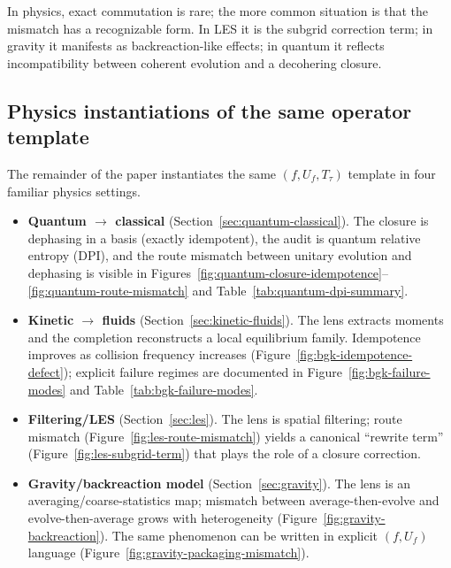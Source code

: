 \documentclass[11pt]{article}
\providecommand{\Lens}{f}
\providecommand{\Uf}{U_f}
\begin{document}
In physics, exact commutation is rare; the more common situation is that the mismatch has a recognizable form. In LES it is the subgrid correction term; in gravity it manifests as backreaction-like effects; in quantum it reflects incompatibility between coherent evolution and a decohering closure.

\subsection{Physics instantiations of the same operator template}
The remainder of the paper instantiates the same $(\Lens,\Uf,T_\tau)$ template in four familiar physics settings.
\begin{itemize}
  \item \textbf{Quantum $\to$ classical} (Section~\ref{sec:quantum-classical}). The closure is dephasing in a basis (exactly idempotent), the audit is quantum relative entropy (DPI), and the route mismatch between unitary evolution and dephasing is visible in Figures~\ref{fig:quantum-closure-idempotence}--\ref{fig:quantum-route-mismatch} and Table~\ref{tab:quantum-dpi-summary}.

  \item \textbf{Kinetic $\to$ fluids} (Section~\ref{sec:kinetic-fluids}). The lens extracts moments and the completion reconstructs a local equilibrium family. Idempotence improves as collision frequency increases (Figure~\ref{fig:bgk-idempotence-defect}); explicit failure regimes are documented in Figure~\ref{fig:bgk-failure-modes} and Table~\ref{tab:bgk-failure-modes}.

  \item \textbf{Filtering/LES} (Section~\ref{sec:les}). The lens is spatial filtering; route mismatch (Figure~\ref{fig:les-route-mismatch}) yields a canonical ``rewrite term'' (Figure~\ref{fig:les-subgrid-term}) that plays the role of a closure correction.

  \item \textbf{Gravity/backreaction model} (Section~\ref{sec:gravity}). The lens is an averaging/coarse-statistics map; mismatch between average-then-evolve and evolve-then-average grows with heterogeneity (Figure~\ref{fig:gravity-backreaction}). The same phenomenon can be written in explicit $(\Lens,\Uf)$ language (Figure~\ref{fig:gravity-packaging-mismatch}).
\end{itemize}
\end{document}
